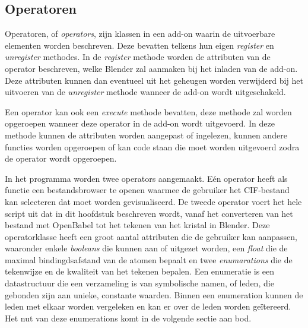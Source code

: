 \subsection{Operatoren}
Operatoren, of \textit{operators}, zijn klassen in een add-on waarin de uitvoerbare elementen worden beschreven. Deze bevatten telkens hun eigen \textit{register} en \textit{unregister} methodes. In de \textit{register} methode worden de attributen van de operator beschreven, welke Blender zal aanmaken bij het inladen van de add-on. Deze attributen kunnen dan eventueel uit het geheugen worden verwijderd bij het uitvoeren van de \textit{unregister} methode wanneer de add-on wordt uitgeschakeld. 
\par
Een operator kan ook een \textit{execute} methode bevatten, deze methode zal worden opgeroepen wanneer deze operator in de add-on wordt uitgevoerd. In deze methode kunnen de attributen worden aangepast of ingelezen, kunnen andere functies worden opgeroepen of kan code staan die moet worden uitgevoerd zodra de operator wordt opgeroepen.
\par
In het programma worden twee operators aangemaakt. Eén operator heeft als functie een bestandsbrowser te openen waarmee de gebruiker het CIF-bestand kan selecteren dat moet worden gevisualiseerd. De tweede operator voert het hele script uit dat in dit hoofdstuk beschreven wordt, vanaf het converteren van het bestand met OpenBabel tot het tekenen van het kristal in Blender. Deze operatorklasse heeft een groot aantal attributen die de gebruiker kan aanpassen, waaronder enkele \textit{booleans} die kunnen aan of uitgezet worden, een \textit{float} die de maximal bindingdsafstand van de atomen bepaalt en twee \textit{enumarations} die de tekenwijze en de kwaliteit van het tekenen bepalen. Een enumeratie is een datastructuur die een verzameling is van symbolische namen, of leden, die gebonden zijn aan unieke, constante waarden. Binnen een enumeration kunnen de leden met elkaar worden vergeleken en kan er over de leden worden geïtereerd.\citep*{ENUM} Het nut van deze enumerations komt in de volgende sectie aan bod.


